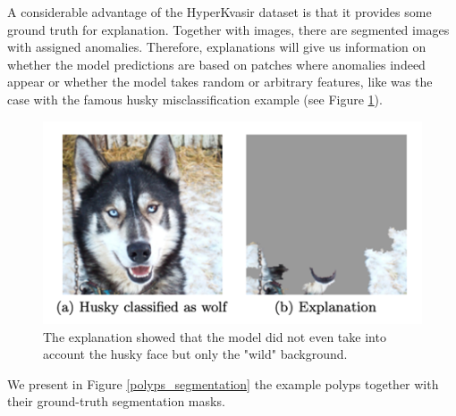 \documentclass[en]{pracamgr}
\begin{document}
A considerable advantage of the HyperKvasir dataset is that it provides some ground truth for explanation. Together with images, there are segmented images with assigned anomalies. Therefore, explanations will give us information on whether the model predictions are based on patches where anomalies indeed appear or whether the model takes random or arbitrary features, like was the case with the famous husky misclassification example (see Figure \ref{husky}).

\begin{figure}[H]
\centering
\includegraphics[scale=0.5]{./images/husky.png}
\caption{The explanation showed that the model did not even take into account the husky face but only the "wild" background.}
\label{husky}
\end{figure}


We present in Figure \ref{polyps_segmentation} the example polyps together with their ground-truth segmentation masks.
\end{document}
